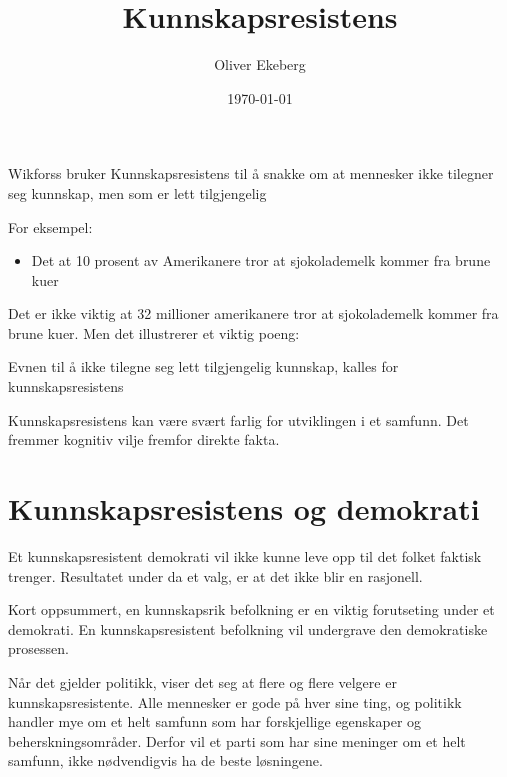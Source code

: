 \documentclass[11pt]{article}
\title{Kunnskapsresistens}
\author{Oliver Ekeberg}
\date{\today}
\begin{document}
\maketitle


\tableofcontents
\vspace{1em}
\vspace{1em}
\vspace{1em}
\vspace{1em}

Wikforss bruker Kunnskapsresistens til å snakke om at mennesker ikke tilegner seg kunnskap, men som er lett tilgjengelig

For eksempel:

\begin{itemize}
    \item Det at 10 prosent av Amerikanere tror at sjokolademelk kommer fra brune kuer
\end{itemize}


Det er ikke viktig at 32 millioner amerikanere tror at sjokolademelk kommer fra brune kuer. Men det illustrerer et viktig poeng:

\vspace{1em}
Evnen til å ikke tilegne seg lett tilgjengelig kunnskap, kalles for kunnskapsresistens

Kunnskapsresistens kan være svært farlig for utviklingen i et samfunn. Det fremmer kognitiv vilje fremfor direkte fakta.

\section{Kunnskapsresistens og demokrati}

Et kunnskapsresistent demokrati vil ikke kunne leve opp til det folket faktisk trenger. Resultatet under da et valg, er at det ikke blir en rasjonell.

\vspace{1em}
Kort oppsummert, en kunnskapsrik befolkning er en viktig forutseting under et demokrati. En kunnskapsresistent befolkning vil undergrave den demokratiske prosessen.


Når det gjelder politikk, viser det seg at flere og flere velgere er kunnskapsresistente. Alle mennesker er gode på hver sine ting, og politikk handler mye om et helt samfunn som har forskjellige egenskaper og beherskningsområder. Derfor vil et parti som har sine meninger om et helt samfunn, ikke nødvendigvis ha de beste løsningene. 
\end{document}
